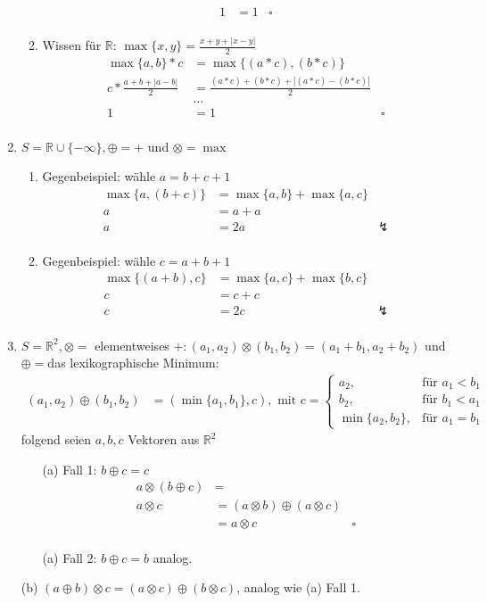 \documentclass[ngerman,a4paper]{report}
\begin{document}
\begin{enumerate}
\begin{enumerate}
\begin{align*}
1 &= 1 &\square\\
\end{align*}
\item  Wissen für $\mathbb{R}$: $\max\{x,y\} = \frac{x+y + |x-y|}{2}$\begin{align*}
\max\{a, b\} * c &= \max\{(a*c),(b*c)\}\\
c* \frac{a+b + |a-b|}{2} &= \frac{(a*c)+(b*c) + |(a*c)-(b*c)|}{2}\\
&\dots \\
1 &= 1 &\square\\
\end{align*}
\end{enumerate}
\item $S=\mathbb{R} \cup \{-\infty\}, \oplus = +$ und $\otimes = \max$
\begin{enumerate}
\item Gegenbeispiel: wähle $a = b + c + 1$\begin{align*}
\max\{a, (b + c)\} &= \max\{a, b\} + \max\{a, c\}\\
a &= a + a \\
a &= 2a &\lightning\\
\end{align*}
\item Gegenbeispiel: wähle $c = a + b + 1$\begin{align*}
\max\{(a + b), c\} &= \max\{a, c\} + \max\{b, c\}\\
c &= c + c \\
c &= 2c &\lightning\\
\end{align*}
\end{enumerate}
\item $S=\mathbb{R}^2, \otimes=$ elementweises $+: (a_1,a_2)\otimes(b_1,b_2) = (a_1+b_1,a_2+b_2)$ und $\oplus=$das lexikographische Minimum:
\begin{align*}
(a_1,a_2)\oplus (b_1,b_2) &= (\min\{a_1,b_1\},c), \text{ mit } c = \begin{cases} a_2, &\text{für }a_1 < b_1 \\ b_2, &\text{für }b_1 < a_1 \\ \min\{a_2,b_2\},&\text{für } a_1=b_1\end{cases}
\end{align*}
folgend seien $a,b,c$ Vektoren aus $\mathbb{R}^2$
\begin{enumerate}
\item[(a)] Fall 1: $b \oplus c = c$
\begin{align*}
a \otimes (b \oplus c) &= \\
a \otimes c &= (a \otimes b) \oplus (a \otimes c)\\
&=a \otimes c &\square \\
\end{align*}
\item[(a)] Fall 2:  $b \oplus c = b$ analog.
\end{enumerate}
\item[(b)] $(a \oplus b) \otimes c = (a \otimes c) \oplus (b \otimes c)$, analog wie (a) Fall 1.
\end{enumerate}
\end{document}
